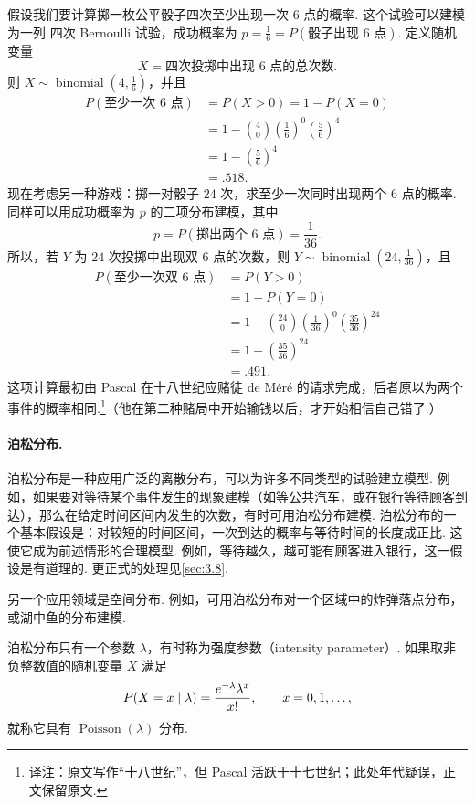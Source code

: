 \begin{example}[掷骰子的概率]\label{ex:3.2.3}
假设我们要计算掷一枚公平骰子四次至少出现一次 $6$ 点的概率. 这个试验可以建模为一列
四次 Bernoulli 试验，成功概率为 $p=\frac16=P(\text{骰子出现 $6$ 点})$. 定义随机变量
$$X=\text{四次投掷中出现 $6$ 点的总次数}.$$
则 $X\sim\operatorname{binomial}(4,\frac16)$，并且
$$\begin{aligned}
P(\text{至少一次 $6$ 点})&=P(X>0)=1-P(X=0)\\
&=1-\binom40\left(\frac16\right)^0\left(\frac56\right)^4\\
&=1-\left(\frac56\right)^4\\
&=.518.
\end{aligned}$$
现在考虑另一种游戏：掷一对骰子 $24$ 次，求至少一次同时出现两个 $6$ 点的概率. 同样可以用成功概率为 $p$ 的二项分布建模，其中
$$p=P(\text{掷出两个 $6$ 点})=\frac1{36}.$$
所以，若 $Y$ 为 $24$ 次投掷中出现双 $6$ 点的次数，则 $Y\sim\operatorname{binomial}(24,\frac1{36})$，且
$$\begin{aligned}
P(\text{至少一次双 $6$ 点})&=P(Y>0)\\
&=1-P(Y=0)\\
&=1-\binom{24}0\left(\frac1{36}\right)^0\left(\frac{35}{36}\right)^{24}\\
&=1-\left(\frac{35}{36}\right)^{24}\\
&=.491.
\end{aligned}$$
这项计算最初由 Pascal 在十八世纪应赌徒 de M\'er\'e 的请求完成，后者原以为两个事件的概率相同.\footnote{译注：原文写作“十八世纪”，但 Pascal 活跃于十七世纪；此处年代疑误，正文保留原文.}（他在第二种赌局中开始输钱以后，才开始相信自己错了.）
\end{example}

\paragraph{泊松分布.}
泊松分布是一种应用广泛的离散分布，可以为许多不同类型的试验建立模型. 例如，如果要对等待某个事件发生的现象建模（如等公共汽车，或在银行等待顾客到达），那么在给定时间区间内发生的次数，有时可用泊松分布建模. 泊松分布的一个基本假设是：对较短的时间区间，一次到达的概率与等待时间的长度成正比. 这使它成为前述情形的合理模型. 例如，等待越久，越可能有顾客进入银行，这一假设是有道理的. 更正式的处理见\autoref{sec:3.8}.

另一个应用领域是空间分布. 例如，可用泊松分布对一个区域中的炸弹落点分布，或湖中鱼的分布建模.

泊松分布只有一个参数 $\lambda$，有时称为强度参数（intensity parameter）. 如果取非负整数值的随机变量 $X$ 满足
\begin{equation}\label{eq:3.2.5}\index{SI0371@泊松}
P(X=x\mid\lambda)=\frac{e^{-\lambda}\lambda^x}{x!},\qquad x=0,1,\ldots,
\end{equation}
就称它具有 $\operatorname{Poisson}(\lambda)$ 分布.

